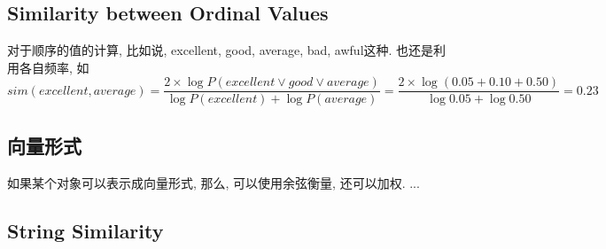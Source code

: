 \documentclass[a4paper,10pt,english]{article}
\begin{document}
\subsection{Similarity between Ordinal Values}
对于顺序的值的计算, 比如说, excellent, good, average, bad, awful这种. 也还是利用各自频率, 如
$$ sim(excellent, average) = \frac{2 \times \log P(excellent \vee good \vee average)}{\log P(excellent) + \log P(average)} = \frac{2 \times \log(0.05+0.10+0.50)}{\log 0.05 + \log 0.50} = 0.23 $$

\subsection{向量形式}
如果某个对象可以表示成向量形式, 那么, 可以使用余弦衡量, 还可以加权.
...
\subsection{String Similarity}
\end{document}

